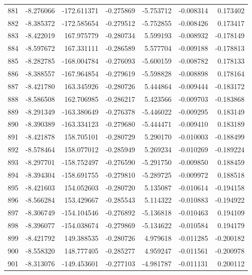 \begin{tabular}{rrrrrrr}
 881 &  -8.276066 & -172.611371 & -0.275869 &   -5.753712 &   -0.008314 &  0.173402 \\
 882 &  -8.385372 & -172.585654 & -0.279512 &   -5.752855 &   -0.008426 &  0.173417 \\
 883 &  -8.422019 &  167.975779 & -0.280734 &    5.599193 &   -0.008932 & -0.178149 \\
 884 &  -8.597672 &  167.331111 & -0.286589 &    5.577704 &   -0.009188 & -0.178813 \\
 885 &  -8.282785 & -168.004784 & -0.276093 &   -5.600159 &   -0.008782 &  0.178133 \\
 886 &  -8.388557 & -167.964854 & -0.279619 &   -5.598828 &   -0.008898 &  0.178164 \\
 887 &  -8.421780 &  163.345926 & -0.280726 &    5.444864 &   -0.009444 & -0.183172 \\
 888 &  -8.586508 &  162.706985 & -0.286217 &    5.423566 &   -0.009703 & -0.183868 \\
 889 &  -8.291349 & -163.380649 & -0.276378 &   -5.446022 &   -0.009295 &  0.183149 \\
 890 &  -8.390389 & -163.334123 & -0.279680 &   -5.444471 &   -0.009410 &  0.183189 \\
 891 &  -8.421878 &  158.705101 & -0.280729 &    5.290170 &   -0.010003 & -0.188499 \\
 892 &  -8.578464 &  158.077012 & -0.285949 &    5.269234 &   -0.010269 & -0.189224 \\
 893 &  -8.297701 & -158.752497 & -0.276590 &   -5.291750 &   -0.009850 &  0.188459 \\
 894 &  -8.394304 & -158.691755 & -0.279810 &   -5.289725 &   -0.009972 &  0.188518 \\
 895 &  -8.421603 &  154.052603 & -0.280720 &    5.135087 &   -0.010614 & -0.194158 \\
 896 &  -8.566284 &  153.429667 & -0.285543 &    5.114322 &   -0.010883 & -0.194922 \\
 897 &  -8.306749 & -154.104546 & -0.276892 &   -5.136818 &   -0.010463 &  0.194109 \\
 898 &  -8.396077 & -154.038674 & -0.279869 &   -5.134622 &   -0.010584 &  0.194179 \\
 899 &  -8.421792 &  149.388535 & -0.280726 &    4.979618 &   -0.011285 & -0.200182 \\
 900 &  -8.558320 &  148.777405 & -0.285277 &    4.959247 &   -0.011561 & -0.200978 \\
 901 &  -8.313076 & -149.453601 & -0.277103 &   -4.981787 &   -0.011131 &  0.200112 \\

\end{tabular}
